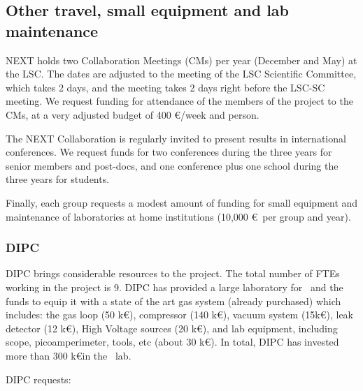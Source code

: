 \subsection{Other travel, small equipment and lab maintenance}
\label{sec:othercosts}

NEXT holds two Collaboration Meetings (CMs) per year (December and May) at the LSC. The dates are adjusted to the meeting of the LSC Scientific Committee, which takes 2 days, and the meeting takes 2 days right before the LSC-SC meeting. We request funding for attendance of the members of the project to the CMs, at a very adjusted budget of 400 \euro/week and person.

The NEXT Collaboration is regularly invited to present results in international conferences. We request funds for two conferences during the three years for senior members and post-docs, and one conference plus one school during the three years for students.

Finally, each group requests a modest amount of funding for small equipment and maintenance of laboratories at home institutions (10,000 \euro\ per group and year). 


\subsubsection{DIPC}

DIPC brings considerable resources to the project. The total number of FTEs working in the project is 9. DIPC has provided a large laboratory for \HDEMO\ and the funds to equip it with a state of the art gas system (already purchased) which includes: the gas loop (50 k\euro), compressor (140 k€),
vacuum system (15k\euro), leak detector (12 k\euro), High Voltage sources (20 k\euro), and lab equipment, including scope, picoamperimeter, tools, etc 
(about 30 k\euro). In total, DIPC has invested more than 300 k\euro in the \HDEMO\ lab. 
 
DIPC requests:

